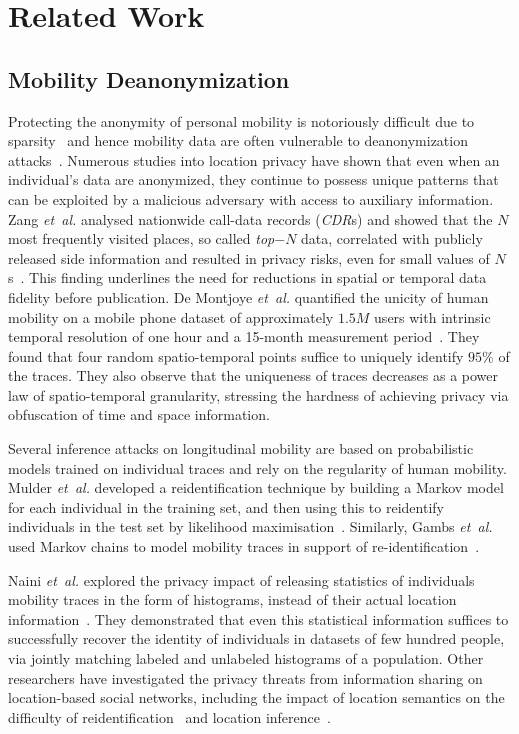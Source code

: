 \section{Related Work}


\subsection{Mobility Deanonymization}

Protecting the anonymity of personal mobility is notoriously difficult due to sparsity~\citep{aggarwal2008} and hence mobility data are often vulnerable to deanonymization attacks~\citep{Narayanan2008}.
Numerous studies into location privacy have shown that even when an individual's data are anonymized, they continue to possess unique patterns that can be exploited by a malicious adversary with access to auxiliary information.
Zang \emph{et~al.} analysed nationwide call-data records (\emph{CDR}s) and showed that the $N$ most frequently visited places, so called \emph{top$-N$} data, correlated with publicly released side information and resulted in privacy risks, even for small values of $N$s~\citep{Zang2011}.
This finding underlines the need for reductions in spatial or temporal data fidelity before publication.
De Montjoye \emph{et~al.} quantified the unicity of human mobility on a mobile phone dataset of approximately $1.5M$ users with intrinsic temporal resolution of one hour and a 15-month measurement period~\citep{DeMontjoye2013}.
They found that four random spatio-temporal points suffice to uniquely identify $ 95\% $ of the traces.
They also observe that the uniqueness of traces decreases as a power law of spatio-temporal granularity, stressing the hardness of achieving privacy via obfuscation of time and space information.

Several inference attacks on longitudinal mobility are based on probabilistic models trained on individual traces and rely on the regularity of human mobility.
Mulder \emph{et~al.} developed a reidentification technique by building a Markov model for each individual in the training set, and then using this to reidentify individuals in the test set by likelihood maximisation~\cite{deMulder08}.
Similarly, Gambs \emph{et~al.} used Markov chains to model mobility traces in support of re-identification~\cite{Gambs2014}.

Naini \emph{et~al.} explored the privacy impact of releasing statistics of individuals mobility traces in the form of histograms, instead of their actual location information~\cite{Naini2016a}. They demonstrated that even this statistical information suffices to successfully recover the identity of individuals in datasets of few hundred people, via jointly matching labeled and unlabeled histograms of a population.
Other researchers have investigated the privacy threats from information sharing on location-based social networks, including the impact of location semantics on the difficulty of reidentification~\cite{privacyAndTheCity} and location inference~\cite{Agir}.

